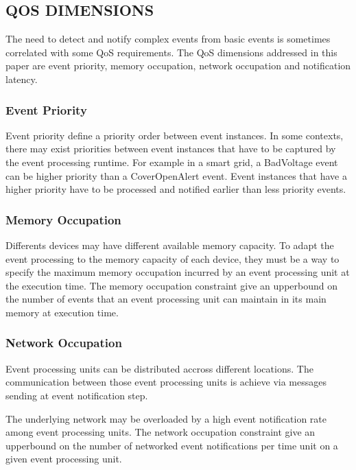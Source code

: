 \documentclass[a4paper,twoside]{article}
\begin{document}
\subsection{\uppercase{QoS Dimensions}}
\label{sec:qos_support}
The need to detect and notify complex events from basic events is sometimes correlated with some QoS requirements. The QoS dimensions addressed in this paper are event priority, memory occupation, network occupation and notification latency. 
\subsubsection{Event Priority}
Event priority define a priority order between event instances. In some contexts, there may exist priorities between event instances that have to be captured by the event processing runtime. For example in a smart grid, a BadVoltage event can be higher priority than a CoverOpenAlert event. Event instances that have a higher priority have to be processed and notified earlier than less priority events. 
\subsubsection{Memory Occupation}
Differents devices may have different available memory capacity. To adapt the event processing to the memory capacity of each device, they must be a way to specify the maximum memory occupation incurred by an event processing unit at the execution time. The memory occupation constraint give an upperbound on the number of events that an event processing unit can maintain in its main memory at execution time.
\subsubsection{Network Occupation}
Event processing units can be distributed accross different locations. The communication between those event processing units is achieve via messages sending at event notification step. 

The underlying network may be overloaded by a high event notification rate among event processing units.  
The network occupation constraint give an upperbound on the number of networked event notifications per time unit on a given event processing unit.  
\end{document}
